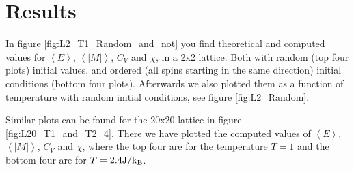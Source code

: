 \documentclass[reprint, english,notitlepage,nofootinbib]{revtex4-1}  %
\begin{document}
\section{Results}

In figure \ref{fig:L2_T1_Random_and_not} you find theoretical and computed values for $\left<E\right>$, $\left<|M|\right>$, $C_V$ and $\chi$, in a 2x2 lattice. Both with random (top four plots) initial values, and ordered (all spins starting in the same direction) initial conditions (bottom four plots). Afterwards we also plotted them as a function of temperature with random initial conditions, see figure \ref{fig:L2_Random}.

Similar plots can be found for the 20x20 lattice in figure \ref{fig:L20_T1_and_T2_4}. There we have plotted the computed values of $\left<E\right>$, $\left<|M|\right>$, $C_V$ and $\chi$, where the top four are for the temperature $T=1$ and the bottom four are for $T=2.4\rm{J}/k_B$.
\end{document}
